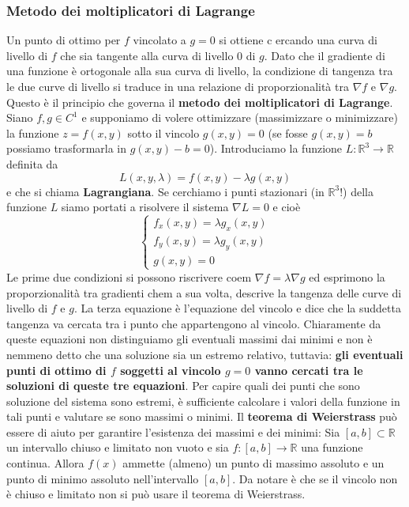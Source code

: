 \subsubsection{Metodo dei moltiplicatori di Lagrange}
Un punto di ottimo per $f$ vincolato a $g = 0$ si ottiene c ercando una curva di livello di $f$ che sia tangente alla curva di livello $0$ di $g$. Dato che il gradiente di una funzione è ortogonale alla sua curva di livello, la condizione di tangenza tra le due curve di livello si traduce in una relazione di proporzionalità tra $\nabla f$ e $\nabla g$. Questo è il principio che governa il \textbf{metodo dei moltiplicatori di Lagrange}.\newline
\newline
Siano $f,g \in C^1$ e supponiamo di volere ottimizzare (massimizzare o minimizzare) la funzione $z = f(x,y)$ sotto il vincolo $g(x,y) = 0$ (se fosse $g(x,y) = b$ possiamo trasformarla in $g(x,y) - b = 0$). Introduciamo la funzione $L : \mathbb{R}^3 \rightarrow \mathbb{R}$ definita da
\[
    L(x,y,\lambda) = f(x,y) - \lambda g(x,y)
\]
e che si chiama \textbf{Lagrangiana}. Se cerchiamo i punti stazionari (in $\mathbb{R}^3$!) della funzione $L$ siamo portati a risolvere il sistema $\nabla L = 0$ e cioè
\[
    \begin{cases}
        f_x(x,y) = \lambda g_x(x,y) \\  
        f_y (x,y) = \lambda g_y(x,y)\\
        g(x,y) = 0
    \end{cases}
\]
Le prime due condizioni si possono riscrivere coem $\nabla f = \lambda \nabla g$ ed esprimono la proporzionalità tra gradienti chem a sua volta, descrive la tangenza delle curve di livello di $f$ e $g$. La terza equazione è l'equazione del vincolo e dice che la suddetta tangenza va cercata tra i punto che appartengono al vincolo.\newline
Chiaramente da queste equazioni non distinguiamo gli eventuali massimi dai minimi e non è nemmeno detto che una soluzione sia un estremo relativo, tuttavia: \textbf{gli eventuali punti di ottimo di $f$ soggetti al vincolo $g = 0$ vanno cercati tra le soluzioni di queste tre equazioni}.\newline
\newline
Per capire quali dei punti che sono soluzione del sistema sono estremi, è sufficiente calcolare i valori della funzione in tali punti e valutare se sono massimi o minimi.\newline
\newline
Il \textbf{teorema di Weierstrass} può essere di aiuto per garantire l'esistenza dei massimi e dei minimi: Sia $[a,b]\subset \mathbb {R}$ un intervallo chiuso e limitato non vuoto e sia $f\colon [a,b]\to \mathbb {R}$ una funzione continua. Allora $f(x)$ ammette (almeno) un punto di massimo assoluto e un punto di minimo assoluto nell'intervallo $[a,b]$. Da notare è che se il vincolo non è chiuso e limitato non si può usare il teorema di Weierstrass.\newline
